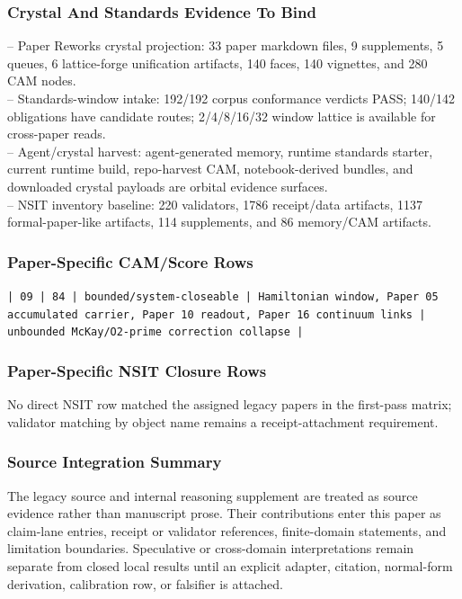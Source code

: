 \documentclass[11pt]{article}
\begin{document}
\subsubsection*{Crystal And Standards Evidence To Bind}

\noindent{}-- Paper Reworks crystal projection: 33 paper markdown files, 9 supplements, 5 queues, 6 lattice-forge unification artifacts, 140 faces, 140 vignettes, and 280 CAM nodes.\\
\noindent{}-- Standards-window intake: 192/192 corpus conformance verdicts PASS; 140/142 obligations have candidate routes; 2/4/8/16/32 window lattice is available for cross-paper reads.\\
\noindent{}-- Agent/crystal harvest: agent-generated memory, runtime standards starter, current runtime build, repo-harvest CAM, notebook-derived bundles, and downloaded crystal payloads are orbital evidence surfaces.\\
\noindent{}-- NSIT inventory baseline: 220 validators, 1786 receipt/data artifacts, 1137 formal-paper-like artifacts, 114 supplements, and 86 memory/CAM artifacts.\\

\subsubsection*{Paper-Specific CAM/Score Rows}

\noindent\texttt{| 09 | 84 | bounded/system-closeable | Hamiltonian window, Paper 05 accumulated carrier, Paper 10 readout, Paper 16 continuum links | unbounded McKay/O2-prime correction collapse |}\\

\subsubsection*{Paper-Specific NSIT Closure Rows}

No direct NSIT row matched the assigned legacy papers in the first-pass matrix; validator matching by object name remains a receipt-attachment requirement.

\subsubsection*{Source Integration Summary}

The legacy source and internal reasoning supplement are treated as source
evidence rather than manuscript prose. Their contributions enter this paper as
claim-lane entries, receipt or validator references, finite-domain statements,
and limitation boundaries. Speculative or cross-domain interpretations remain
separate from closed local results until an explicit adapter, citation,
normal-form derivation, calibration row, or falsifier is attached.
\end{document}
